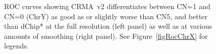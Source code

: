 \documentclass{bioinfo}
\begin{document}
\begin{figure}[!tpbh]
\begin{center}
\end{center}
 \caption{
   ROC curves showing CRMA~v2 differentiates between CN=1 and CN=0 (ChrY) as good as or slightly worse than CN5, and better than dChip* at the full resolution (left panel) as well as at various amounts of smoothing (right panel).  
   See Figure~\ref{figRocChrX} for legends.
 }
 \label{figRocChrY}
\end{figure}
\end{document}
